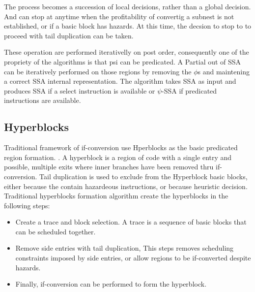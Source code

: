 The process becomes a succession of local decisions, rather than a global decision. And can stop at anytime when the profitability of convertig a subnest is not established, or if a basic block has hazards. At this time, the decsion to stop to to proceed with tail duplication can be taken.

These operation are performed iterativelly on post order, consequently one of the propriety of the algorithms is that psi can be predicated. A Partial out of SSA can be iteratively performed on those regions by removing the $\phi$s and maintening a correct SSA internal representation. The algorithm takes SSA as input and produces SSA if a select instruction is available or $\psi$-SSA if predicated instructions are available. 

\subsection{Hyperblocks}

Traditional framework of if-conversion use Hperblocks as the basic predicated region formation. \cite{Mahlke:1992:ECS:144965.144998}. A hyperblock is a region of code with a single entry and possible, multiple exits where inner branches have been removed thru if-conversion. Tail duplication is used to exclude from the Hyperblock basic blocks, either because the contain hazardeous instructions, or because heuristic decision. 
Traditional hyperblocks formation algorithm create the hyperblocks in the following steps:
\begin{itemize}
\item Create a trace and block selection. A trace is a sequence of basic blocks that can be scheduled together. 
\item Remove side entries with tail duplication, This steps removes scheduling constraints imposed by side entries, or allow regions to be if-converted despite hazards.
\item Finally, if-conversion can be performed to form the hyperblock. 
\end{itemize}

